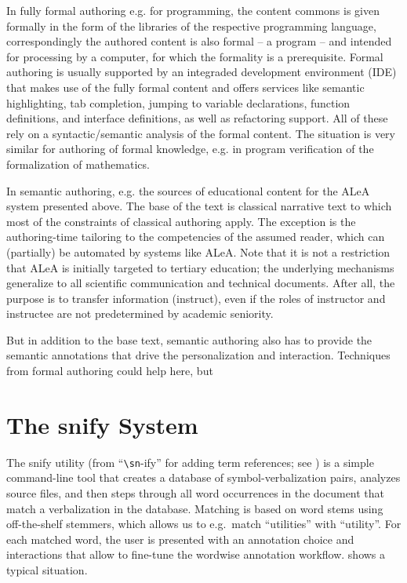 \documentclass{llncs}
\newcommand\ALeA{\textsf{ALeA}\xspace}
\newcommand\snify{\textsf{snify}\xspace}
\begin{document}
In fully formal authoring e.g. for programming, the content commons is given formally in
the form of the libraries of the respective programming language, correspondingly the
authored content is also formal -- a program -- and intended for processing by a computer,
for which the formality is a prerequisite. Formal authoring is usually supported by an
integraded development environment (IDE) that makes use of the fully formal content and
offers services like semantic highlighting, tab completion, jumping to variable
declarations, function definitions, and interface definitions, as well as refactoring
support. All of these rely on a syntactic/semantic analysis of the formal content. The
situation is very similar for authoring of formal knowledge, e.g. in program verification
of the formalization of mathematics.

In semantic authoring, e.g. the \sTeX sources of educational content for the \ALeA system
presented above. The base of the text is classical narrative text to which most of the
constraints of classical authoring apply. The exception is the authoring-time tailoring to
the competencies of the assumed reader, which can (partially) be automated by systems like
\ALeA. Note that it is not a restriction that \ALeA is initially targeted to tertiary
education; the underlying mechanisms generalize to all scientific communication and
technical documents. After all, the purpose is to transfer information (instruct), even if
the roles of instructor and instructee are not predetermined by academic seniority.

But in addition to the base text, semantic authoring also has to provide the semantic
annotations that drive the personalization and interaction. Techniques from formal
authoring could help here, but 
  
\section{The \snify System}

The \snify utility (from ``\texttt{\textbackslash sn}-ify'' for adding term references;
see \cite{stextools:git}) is a simple command-line tool that creates a database of
symbol-verbalization pairs, analyzes \sTeX source files, and then steps through all word
occurrences in the document that match a verbalization in the database.  Matching is based
on word stems using off-the-shelf stemmers, which allows us to e.g.\ match ``utilities''
with ``utility''.  For each matched word, the user is presented with an annotation choice
and interactions that allow to fine-tune the wordwise annotation
workflow.  shows a typical situation.
\end{document}
